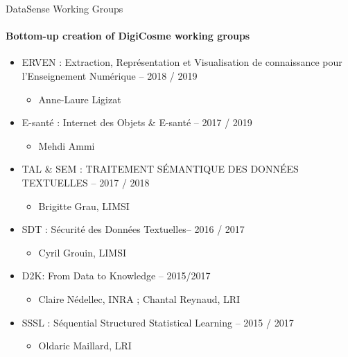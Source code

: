 \begin{frame}{DataSense Working Groups}
  \framesubtitle{Bottom-up creation of DigiCosme working groups}

      \begin{itemize}
       \item {\small ERVEN : Extraction, Représentation et Visualisation de connaissance pour
l'Enseignement Numérique -- 2018 / 2019}
        \begin{itemize}
        \item Anne-Laure Ligizat
        \end{itemize}

        \item E-santé : Internet des Objets \& E-santé -- 2017 / 2019
        \begin{itemize}
        \item Mehdi Ammi
        \end{itemize}

        \item TAL \& SEM : TRAITEMENT SÉMANTIQUE DES DONNÉES TEXTUELLES -- 2017 / 2018
        \begin{itemize}
        \item  Brigitte Grau, LIMSI
        \end{itemize}

        \item SDT : Sécurité des Données Textuelles-- 2016 / 2017
        \begin{itemize}
        \item Cyril Grouin, LIMSI
        \end{itemize}

      \item D2K: From Data to Knowledge -- 2015/2017
        \begin{itemize}
        \item Claire Nédellec, INRA ; Chantal Reynaud, LRI 
        \end{itemize}

        \item SSSL : Séquential Structured Statistical Learning – 2015 / 2017
          \begin{itemize}
          \item Oldaric Maillard, LRI
          \end{itemize}
      \end{itemize}    
\end{frame}


